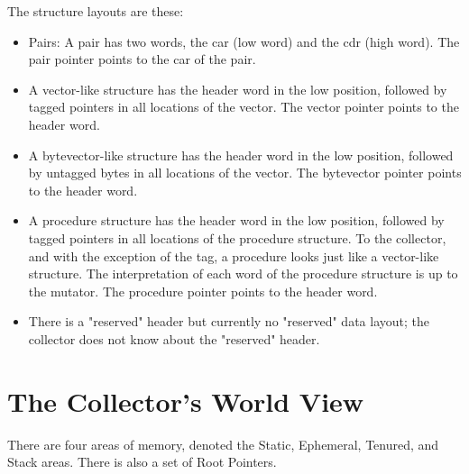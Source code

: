 The structure layouts are these:

\begin{itemize}
\item
Pairs: A pair has two words, the car (low word) and the cdr (high word).
The pair pointer points to the car of the pair.

\item
A vector-like structure has the header word in the low position, followed
by tagged pointers in all locations of the vector. The vector pointer
points to the header word.

\item
A bytevector-like structure has the header word in the low position,
followed by untagged bytes in all locations of the vector. The bytevector
pointer points to the header word.

\item
A procedure structure has the header word in the low position, followed
by tagged pointers in all locations of the procedure structure. To the
collector, and with the exception of the tag, a procedure looks just like
a vector-like structure. The interpretation of each word of the procedure
structure is up to the mutator. The procedure pointer points to the
header word.

\item
There is a "reserved" header but currently no "reserved" data layout; the
collector does not know about the "reserved" header.
\end{itemize}

\section{The Collector's World View}

There are four areas of memory, denoted the Static, Ephemeral, Tenured, and
Stack areas. There is also a set of Root Pointers.

